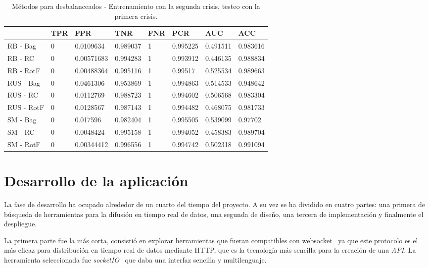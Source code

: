 \begin{table}\scriptsize
	\begin{center}
		\begin{tabular}{llllllll}
			\toprule
			{} & TPR &         FPR &       TNR & FNR &       PCR &       AUC &       ACC \\
			\midrule
			RB - Bag                &   0 &   0.0109634 &  0.989037 &   1 &  0.995225 &  0.491511 &  0.983616 \\
			RB - RC       &   0 &  0.00571683 &  0.994283 &   1 &  0.993912 &  0.446135 &  0.988834 \\
			RB - RotF        &   0 &  0.00488364 &  0.995116 &   1 &   0.99517 &  0.525534 &  0.989663 \\
			RUS - Bag          &   0 &   0.0461306 &  0.953869 &   1 &  0.994863 &  0.514533 &  0.948642 \\
			RUS - RC &   0 &   0.0112769 &  0.988723 &   1 &  0.994602 &  0.506568 &  0.983304 \\
			RUS - RotF  &   0 &   0.0128567 &  0.987143 &   1 &  0.994482 &  0.468075 &  0.981733 \\
			SM - Bag                         &   0 &    0.017596 &  0.982404 &   1 &  0.995505 &  0.539099 &   0.97702 \\
			SM - RC                &   0 &   0.0048424 &  0.995158 &   1 &  0.994052 &  0.458383 &  0.989704 \\
			SM - RotF                 &   0 &  0.00344412 &  0.996556 &   1 &  0.994742 &  0.502318 &  0.991094 \\
			\bottomrule
		\end{tabular}
		\caption{Métodos para desbalanceados - Entrenamiento con la segunda crisis, testeo con la primera crisis.}
		\label{tab:crisis2}
	\end{center}
\end{table}

\section{Desarrollo de la aplicación}
La fase de desarrollo ha ocupado alrededor de un cuarto del tiempo del proyecto. A su vez se ha dividido en cuatro partes: una primera de búsqueda de herramientas para la difusión en tiempo real de datos, una segunda de diseño, una tercera de implementación y finalmente el despliegue.

La primera parte fue la más corta, consistió en explorar herramientas que fueran compatibles con websocket~\cite{wiki:websocket} ya que este protocolo es el más eficaz para distribución en tiempo real de datos mediante HTTP, que es la tecnología más sencilla para la creación de una \textit{API}. La herramienta seleccionada fue \textit{socketIO}~\cite{tool:socketio} que daba una interfaz sencilla y multilenguaje.

